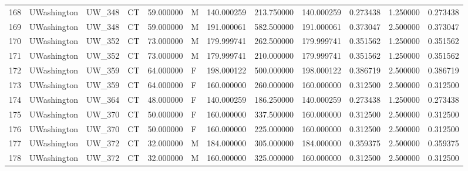 \begin{tabular}{llllrlrrrrrr}
168    &     UWashington &       UW\_348 &                 CT &  59.000000 &        M &       140.000259 &    213.750000 &  140.000259 &               0.273438 &            1.250000 &          0.273438 \\
169    &     UWashington &       UW\_348 &                 CT &  59.000000 &        M &       191.000061 &    582.500000 &  191.000061 &               0.373047 &            2.500000 &          0.373047 \\
170    &     UWashington &       UW\_352 &                 CT &  73.000000 &        M &       179.999741 &    262.500000 &  179.999741 &               0.351562 &            1.250000 &          0.351562 \\
171    &     UWashington &       UW\_352 &                 CT &  73.000000 &        M &       179.999741 &    210.000000 &  179.999741 &               0.351562 &            1.250000 &          0.351562 \\
172    &     UWashington &       UW\_359 &                 CT &  64.000000 &        F &       198.000122 &    500.000000 &  198.000122 &               0.386719 &            2.500000 &          0.386719 \\
173    &     UWashington &       UW\_359 &                 CT &  64.000000 &        F &       160.000000 &    260.000000 &  160.000000 &               0.312500 &            2.500000 &          0.312500 \\
174    &     UWashington &       UW\_364 &                 CT &  48.000000 &        F &       140.000259 &    186.250000 &  140.000259 &               0.273438 &            1.250000 &          0.273438 \\
175    &     UWashington &       UW\_370 &                 CT &  50.000000 &        F &       160.000000 &    337.500000 &  160.000000 &               0.312500 &            2.500000 &          0.312500 \\
176    &     UWashington &       UW\_370 &                 CT &  50.000000 &        F &       160.000000 &    225.000000 &  160.000000 &               0.312500 &            2.500000 &          0.312500 \\
177    &     UWashington &       UW\_372 &                 CT &  32.000000 &        M &       184.000000 &    305.000000 &  184.000000 &               0.359375 &            2.500000 &          0.359375 \\
178    &     UWashington &       UW\_372 &                 CT &  32.000000 &        M &       160.000000 &    325.000000 &  160.000000 &               0.312500 &            2.500000 &          0.312500 \\

\end{tabular}

